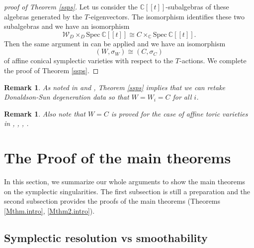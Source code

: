 \documentclass[12pt,a4paper]{amsart}
\newtheorem{Rem}[Thm]{Remark}
\theoremstyle{remark}
\theoremstyle{definition}
\def\C{\mathbb{C}}
\begin{document}
\begin{proof}[proof of Theorem \ref{ssps}]
Let us consider the $\C[[t]]$-subalgebras of these algebras 
generated by the $T$-eigenvectors. The isomorphism identifies these two subalgebras 
and we have an isomorphism 
$$\mathcal{W}_D \times_D \mathrm{Spec}\: \C[[t]] 
\cong C \times_{\C} \mathrm{Spec}\:\C[[t]].$$
Then the same argument in \cite[Corollary 3.2]{Namf} can be applied and we have an isomorphism  
$$(W, \sigma_W) \cong (C, \sigma_C)$$ of affine conical symplectic varieties with respect to the $T$-actions.  
We complete the proof of Theorem \ref{ssps}.   
\end{proof}

\begin{Rem}
As noted in
\cite[3.6]{HeinSun} and \cite[5.1]{Zha24}, 
Theorem \ref{ssps} implies that
we can retake Donaldson-Sun degeneration data so that 
$W=W_i=C$ for all $i$. 
\end{Rem}

\begin{Rem}
Also note that 
$W=C$ is proved for the case of affine toric varieties 
in \cite{FOW}, \cite{Ber.toric}, \cite[\S 1]{CS2}, 
\cite[\S 2]{Od24a}. 
\end{Rem}
\section{The Proof of the main theorems}\label{sec:sum}

In this section, we summarize our whole arguments to show the 
main theorems on the symplectic singularities. The first subsection 
is still a preparation and the second subsection provides the proofs of the main theorems (Theorems \ref{Mthm.intro}, 
\ref{Mthm2.intro}). 

\subsection{Symplectic resolution vs smoothability}
\end{document}
